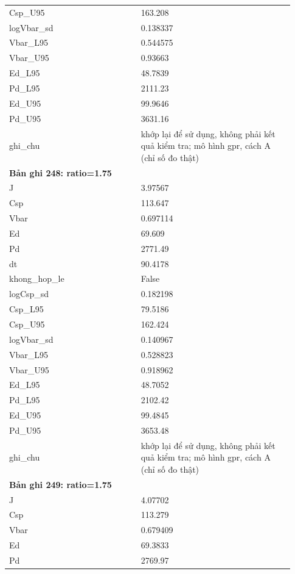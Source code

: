 \begin{longtable}{p{0.43\linewidth}p{0.50\linewidth}}
Csp\_\allowbreak U95 & 163.208 \\
logVbar\_\allowbreak sd & 0.138337 \\
Vbar\_\allowbreak L95 & 0.544575 \\
Vbar\_\allowbreak U95 & 0.93663 \\
Ed\_\allowbreak L95 & 48.7839 \\
Pd\_\allowbreak L95 & 2111.23 \\
Ed\_\allowbreak U95 & 99.9646 \\
Pd\_\allowbreak U95 & 3631.16 \\
ghi\_\allowbreak chu & khớp lại để sử dụng, không phải kết quả kiểm tra; mô hình gpr, cách A (chỉ số đo thật) \\
\midrule
\multicolumn{2}{p{0.95\linewidth}}{\textbf{Bản ghi 248: ratio=1.75}} \\
J & 3.97567 \\
Csp & 113.647 \\
Vbar & 0.697114 \\
Ed & 69.609 \\
Pd & 2771.49 \\
dt & 90.4178 \\
khong\_\allowbreak hop\_\allowbreak le & False \\
logCsp\_\allowbreak sd & 0.182198 \\
Csp\_\allowbreak L95 & 79.5186 \\
Csp\_\allowbreak U95 & 162.424 \\
logVbar\_\allowbreak sd & 0.140967 \\
Vbar\_\allowbreak L95 & 0.528823 \\
Vbar\_\allowbreak U95 & 0.918962 \\
Ed\_\allowbreak L95 & 48.7052 \\
Pd\_\allowbreak L95 & 2102.42 \\
Ed\_\allowbreak U95 & 99.4845 \\
Pd\_\allowbreak U95 & 3653.48 \\
ghi\_\allowbreak chu & khớp lại để sử dụng, không phải kết quả kiểm tra; mô hình gpr, cách A (chỉ số đo thật) \\
\midrule
\multicolumn{2}{p{0.95\linewidth}}{\textbf{Bản ghi 249: ratio=1.75}} \\
J & 4.07702 \\
Csp & 113.279 \\
Vbar & 0.679409 \\
Ed & 69.3833 \\
Pd & 2769.97 \\

\end{longtable}
